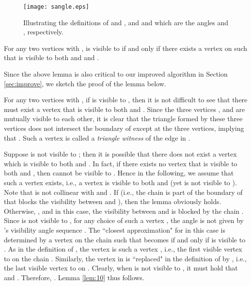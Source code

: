 \documentclass[11pt]{article}
\def\lemmaspace{\vspace*{0in}}
\begin{document}
\begin{figure}[t]
\begin{minipage}[t]{\linewidth}
\begin{center}
\texttt{[image: sangle.eps]}
\caption{\footnotesize Illustrating the definitions of  and
, and  and
 which are the angles  and
, respectively. 
}\label{fig:sangle}
\end{center}
\end{minipage}
\end{figure}

\lemmaspace
\begin{lemma}\label{lem:10}\cite{ref:DisserRe10}
For any two vertices  with , 
 is visible
to  if and only if there exists a vertex  on
 such that  is visible to both  and
 and
. 
\end{lemma}
\lemmaspace

Since the above lemma is also critical to our improved algorithm in 
Section \ref{sec:improve}, we sketch the proof of the lemma below. 

For any two
vertices  with , if  is visible to
, then it is not difficult to see that 
there must exist a vertex  that is 
visible to both  and . Since the three vertices
, and  are mutually visible to each other, it is clear
that the triangle formed by these three vertices does not intersect the
boundary of  except at the three vertices, implying 
that . 
Such a vertex  is called a {\em triangle witness} of the edge
 in . 

Suppose  is not visible to ; then it is possible that there does not
exist a vertex  which is visible
to both  and . In fact, if there 
exists no vertex  that is visible
to both  and , then  cannot be visible to . Hence in
the following, we assume that such a vertex  exists, i.e., a
vertex  is visible to both  and  (yet  is not visible to ).
Note that  is not collinear with  and .
If  (i.e., the chain  is part of the
boundary of  that blocks
the visibility between  and ), then the lemma obviously holds.  Otherwise,
, and in this case,
the visibility between  and  is blocked
by the chain .
Since  is not visible to , for any choice of such a vertex , 
the angle 
is not given by 's visibility angle sequence . 
The ``closest approximation" for  in this case is determined by
a vertex  on the chain  such that  becomes  if and
only if  is visible to .
As in the definition of
, the vertex  is such a vertex , i.e., the
first visible vertex to  on the chain .
Similarly, the
vertex  in  is ``replaced" in the definition
of  by , i.e.,
the last visible vertex to  on .
Clearly, when  is not visible to , it must hold that 
 and
. Therefore,  
.
Lemma \ref{lem:10} thus follows. 
\end{document}
